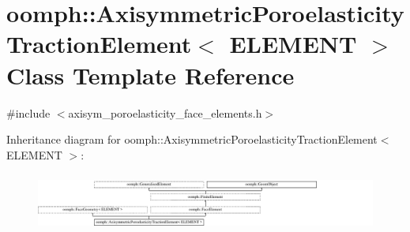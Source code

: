 \hypertarget{classoomph_1_1AxisymmetricPoroelasticityTractionElement}{}\section{oomph\+:\+:Axisymmetric\+Poroelasticity\+Traction\+Element$<$ E\+L\+E\+M\+E\+NT $>$ Class Template Reference}
\label{classoomph_1_1AxisymmetricPoroelasticityTractionElement}


{\ttfamily \#include $<$axisym\+\_\+poroelasticity\+\_\+face\+\_\+elements.\+h$>$}

Inheritance diagram for oomph\+:\+:Axisymmetric\+Poroelasticity\+Traction\+Element$<$ E\+L\+E\+M\+E\+NT $>$\+:\begin{figure}[H]
\begin{center}
\leavevmode
\includegraphics[height=1.939394cm]{classoomph_1_1AxisymmetricPoroelasticityTractionElement}
\end{center}
\end{figure}
